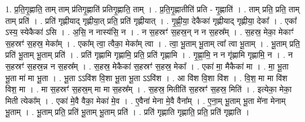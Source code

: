 \documentclass[17pt]{extarticle}
\begin{document}
1. प्र॒ति॒गृ॒ह्णाति॒ ताम् ताम् प्र॑तिगृ॒ह्णाति॑ प्रतिगृ॒ह्णाति॒ ताम् । . प्र॒ति॒गृ॒ह्णातीति॑ प्रति - गृ॒ह्णाति॑ । . ताम् प्रति॒ प्रति॒ ताम् ताम् प्रति॑ । . प्रति॑ गृह्णीयाद् गृह्णीया॒त् प्रति॒ प्रति॑ गृह्णीयात् । . गृ॒ह्णी॒या॒ देकैका॑ गृह्णीयाद् गृह्णीया॒ देका᳚ । . एका᳚ ऽस्य॒ स्येकैका॑ ऽसि । . अ॒सि॒ न नास्य॑सि॒ न । . न स॒हस्रꣳ॑ स॒हस्र॒न् न न स॒हस्र᳚म् । . स॒हस्र॒ मेका॒ मेकाꣳ॑ स॒हस्रꣳ॑ स॒हस्र॒ मेका᳚म् । . एका᳚म् त्वा॒ त्वैका॒ मेका᳚म् त्वा । . त्वा॒ भू॒ताम् भू॒ताम् त्वा᳚ त्वा भू॒ताम् । . भू॒ताम् प्रति॒ प्रति॑ भू॒ताम् भू॒ताम् प्रति॑ । . प्रति॑ गृह्णामि गृह्णामि॒ प्रति॒ प्रति॑ गृह्णामि । . गृ॒ह्णा॒मि॒ न न गृ॑ह्णामि गृह्णामि॒ न । . न स॒हस्रꣳ॑ स॒हस्र॒न्न न स॒हस्र᳚म् । . स॒हस्र॒ मेकैका॑ स॒हस्रꣳ॑ स॒हस्र॒ मेका᳚ । . एका॑ मा॒ मैकैका॑ मा । . मा॒ भू॒ता भू॒ता मा॑ मा भू॒ता । . भू॒ता ऽऽवि॑श वि॒शा भू॒ता भू॒ता ऽऽवि॑श । . आ वि॑श वि॒शा वि॑श । . वि॒श॒ मा मा वि॑श विश॒ मा । . मा स॒हस्रꣳ॑ स॒हस्र॒म् मा मा स॒हस्र᳚म् । . स॒हस्र॒ मितीति॑ स॒हस्रꣳ॑ स॒हस्र॒ मिति॑ । . इत्येका॒ मेका॒ मिती त्येका᳚म् । . एका॑ मे॒वै वैका॒ मेका॑ मे॒व । . ए॒वैना॑ मेना मे॒वै वैना᳚म् । . ए॒ना॒म् भू॒ताम् भू॒ता मे॑ना मेनाम् भू॒ताम् । . भू॒ताम् प्रति॒ प्रति॑ भू॒ताम् भू॒ताम् प्रति॑ । . प्रति॑ गृह्णाति गृह्णाति॒ प्रति॒ प्रति॑ गृह्णाति । \newline
\end{document}
